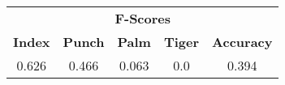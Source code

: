 \documentclass{standalone}
\begin{document}
 
 \begin{tabular}{|c|c|c|c ||c|}
\cline{1-5}\multicolumn{5}{|c|}{\textbf{F-Scores}} \\ 
\cline{1-5}\textbf{Index} & \textbf{Punch} & \textbf{Palm} & \textbf{Tiger} & \textbf{Accuracy}\\ 
\cline{1-5}0.626 & 0.466 & 0.063 & 0.0 & 0.394\\ 
 \cline{1-5}\hline \end{tabular}
 
\end{document}
